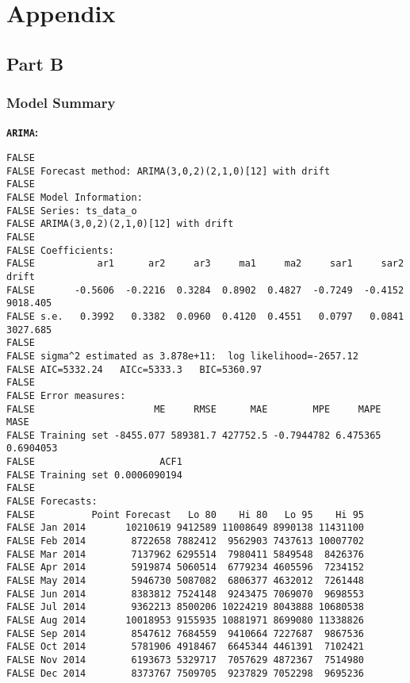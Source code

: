 \documentclass[openany]{book}
\begin{document}
\chapter*{Appendix}\label{Appendix}

\section*{Part B}\label{Part-B}

\subsection*{Model Summary}\label{Part-B-summary}

\textbf{\texttt{ARIMA}:}

\begin{verbatim}
FALSE 
FALSE Forecast method: ARIMA(3,0,2)(2,1,0)[12] with drift
FALSE 
FALSE Model Information:
FALSE Series: ts_data_o 
FALSE ARIMA(3,0,2)(2,1,0)[12] with drift 
FALSE 
FALSE Coefficients:
FALSE           ar1      ar2     ar3     ma1     ma2     sar1     sar2     drift
FALSE       -0.5606  -0.2216  0.3284  0.8902  0.4827  -0.7249  -0.4152  9018.405
FALSE s.e.   0.3992   0.3382  0.0960  0.4120  0.4551   0.0797   0.0841  3027.685
FALSE 
FALSE sigma^2 estimated as 3.878e+11:  log likelihood=-2657.12
FALSE AIC=5332.24   AICc=5333.3   BIC=5360.97
FALSE 
FALSE Error measures:
FALSE                     ME     RMSE      MAE        MPE     MAPE      MASE
FALSE Training set -8455.077 589381.7 427752.5 -0.7944782 6.475365 0.6904053
FALSE                      ACF1
FALSE Training set 0.0006090194
FALSE 
FALSE Forecasts:
FALSE          Point Forecast   Lo 80    Hi 80   Lo 95    Hi 95
FALSE Jan 2014       10210619 9412589 11008649 8990138 11431100
FALSE Feb 2014        8722658 7882412  9562903 7437613 10007702
FALSE Mar 2014        7137962 6295514  7980411 5849548  8426376
FALSE Apr 2014        5919874 5060514  6779234 4605596  7234152
FALSE May 2014        5946730 5087082  6806377 4632012  7261448
FALSE Jun 2014        8383812 7524148  9243475 7069070  9698553
FALSE Jul 2014        9362213 8500206 10224219 8043888 10680538
FALSE Aug 2014       10018953 9155935 10881971 8699080 11338826
FALSE Sep 2014        8547612 7684559  9410664 7227687  9867536
FALSE Oct 2014        5781906 4918467  6645344 4461391  7102421
FALSE Nov 2014        6193673 5329717  7057629 4872367  7514980
FALSE Dec 2014        8373767 7509705  9237829 7052298  9695236
\end{verbatim}
\end{document}
